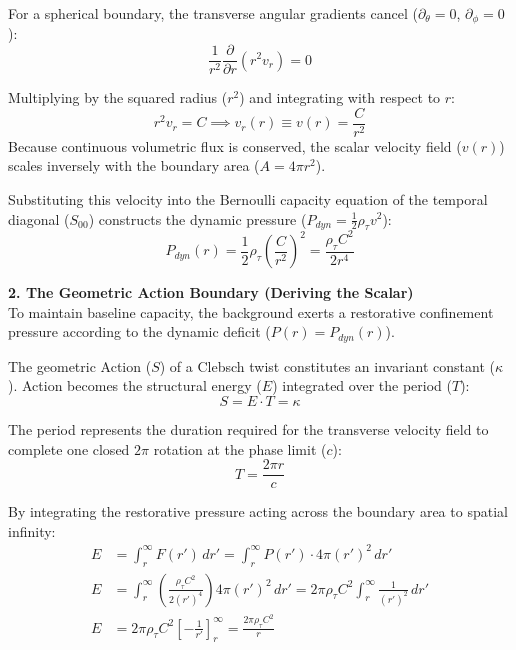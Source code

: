 For a spherical boundary, the transverse angular gradients cancel ($\partial_\theta = 0$, $\partial_\phi = 0$): 
\begin{equation}
    \frac{1}{r^2} \frac{\partial}{\partial r}(r^2 v_r) = 0
\end{equation}

Multiplying by the squared radius ($r^2$) and integrating with respect to $r$: 
\begin{equation}
r^2 v_r = C \implies v_r(r) \equiv v(r) = \frac{C}{r^2} 
\end{equation}
Because continuous volumetric flux is conserved, the scalar velocity field ($v(r)$) scales inversely with the boundary area ($A = 4\pi r^2$). 

Substituting this velocity into the Bernoulli capacity equation of the temporal diagonal ($S_{00}$) constructs the dynamic pressure ($P_{dyn} = \frac{1}{2}\rho_\tau v^2$):
\begin{equation}
    P_{dyn}(r) = \frac{1}{2}\rho_\tau \left( \frac{C}{r^2} \right)^2 = \frac{\rho_\tau C^2}{2 r^4}
\end{equation}

\textbf{2. The Geometric Action Boundary (Deriving the Scalar)} \\
To maintain baseline capacity, the background exerts a restorative confinement pressure according to the dynamic deficit ($P(r) = P_{dyn}(r)$). 

The geometric Action ($S$) of a Clebsch twist constitutes an invariant constant  ($\kappa$). Action becomes the structural energy ($E$) integrated over the period ($T$): 
\begin{equation}
    S = E \cdot T = \kappa
\end{equation}

The period represents the duration required for the transverse velocity field to complete one closed $2\pi$ rotation at the phase limit ($c$):
\begin{equation}
    T = \frac{2\pi r}{c}
\end{equation}

By integrating the restorative pressure acting across the boundary area to spatial infinity: 
\begin{align}
    E &= \int_r^\infty F(r') \, dr' = \int_r^\infty P(r') \cdot 4\pi (r')^2 \, dr' \nonumber \\
    E &= \int_r^\infty \left( \frac{\rho_\tau C^2}{2 (r')^4} \right) 4\pi (r')^2 \, dr' = 2\pi \rho_\tau C^2 \int_r^\infty \frac{1}{(r')^2} \, dr' \nonumber \\
    E &= 2\pi \rho_\tau C^2 \left[ -\frac{1}{r'} \right]_r^\infty = \frac{2\pi \rho_\tau C^2}{r}
\end{align}


